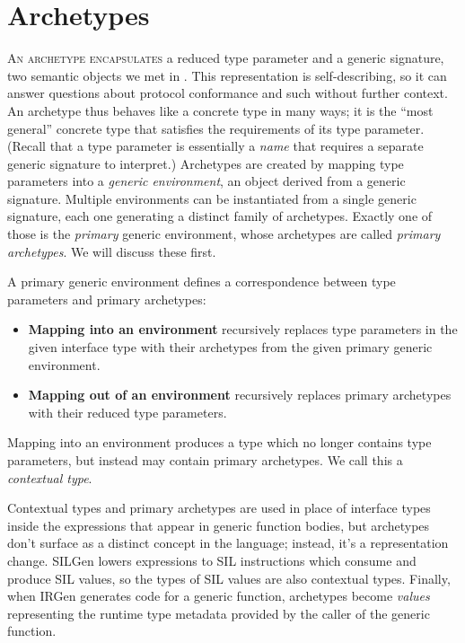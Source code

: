 \documentclass[../generics]{subfiles}
\begin{document}
\chapter{Archetypes}\label{chap:archetypes}

\lettrine{A}{n archetype encapsulates} a reduced type parameter and a generic signature, two semantic objects we met in . This representation is self-describing, so it can answer questions about protocol conformance and such without further context. An archetype thus behaves like a concrete type in many ways; it is the ``most general'' concrete type that satisfies the requirements of its type parameter. (Recall that a type parameter is essentially a \emph{name} that requires a separate generic signature to interpret.) Archetypes are created by mapping type parameters into a \emph{generic environment}, an object derived from a generic signature. Multiple environments can be instantiated from a single generic signature, each one generating a distinct family of archetypes. Exactly one of those is the \emph{primary} generic environment, whose archetypes are called \emph{primary archetypes}. We will discuss these first.

A primary generic environment defines a correspondence between type parameters and primary archetypes:
\begin{itemize}
\item {}\textbf{Mapping into an environment} recursively replaces type parameters in the given interface type with their archetypes from the given primary generic environment.
\item {}\textbf{Mapping out of an environment} recursively replaces primary archetypes with their reduced type parameters.
\end{itemize}
Mapping into an environment produces a type which no longer contains type parameters, but instead may contain primary archetypes. We call this a \emph{contextual type}.

Contextual types and primary archetypes are used in place of interface types inside the expressions that appear in generic function bodies, but archetypes don't surface as a distinct concept in the language; instead, it's a representation change. SILGen lowers expressions to SIL instructions which consume and produce SIL values, so the types of SIL values are also contextual types. Finally, when IRGen generates code for a generic function, archetypes become \emph{values} representing the runtime type metadata provided by the caller of the generic function.
\end{document}
